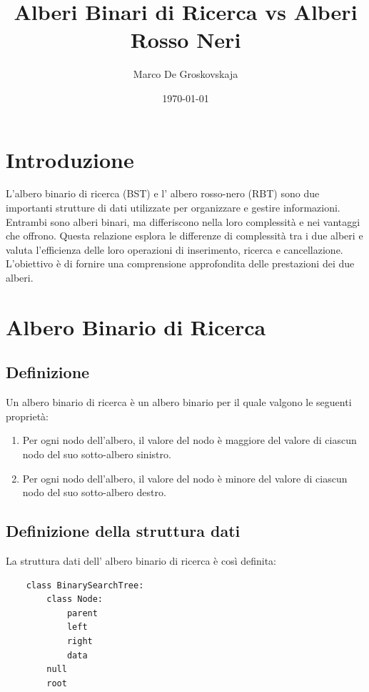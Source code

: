 \documentclass{article}
\title	{Alberi Binari di Ricerca vs Alberi Rosso Neri}
\author	{Marco De Groskovskaja}
\date	{\today}
\begin{document}
	\maketitle
	
	\section{Introduzione}
	
	L'albero binario di ricerca (BST) e l' albero rosso-nero (RBT) sono due importanti strutture di dati utilizzate per organizzare e gestire informazioni. Entrambi sono alberi binari, ma differiscono nella loro complessità e nei vantaggi che offrono. Questa relazione esplora le differenze di complessità tra i due alberi e valuta l'efficienza delle loro operazioni di inserimento, ricerca e cancellazione. L'obiettivo è di fornire una comprensione approfondita delle prestazioni dei due alberi.
	
	\section{Albero Binario di Ricerca}
	
		\subsection{Definizione}
		
			Un albero binario di ricerca è un albero binario per il quale valgono le seguenti proprietà:
		
			\begin{enumerate}
				\item Per ogni nodo dell'albero, il valore del nodo è maggiore del valore di ciascun nodo del suo sotto-albero sinistro.
				\item Per ogni nodo dell'albero, il valore del nodo è minore del valore di ciascun nodo del suo sotto-albero destro.
			\end{enumerate}

		\subsection{Definizione della struttura dati}
			La struttura dati dell' albero binario di ricerca è così definita:

			\begin{lstlisting}
	class BinarySearchTree:
		class Node:
			parent
			left
			right
			data
		null
		root
			\end{lstlisting}
\end{document}
